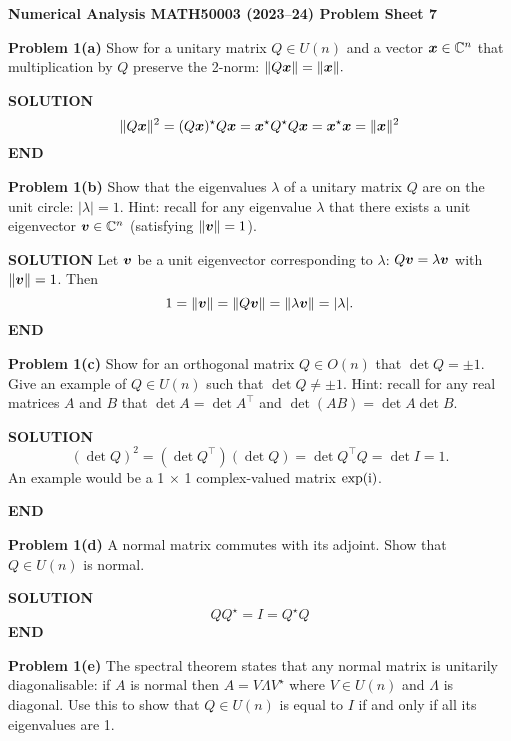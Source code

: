 \documentclass[12pt,a4paper]{article}
\def\endash{–}
\def\bbC{ {\mathbb C} }
\def\x{ {\vc x} }
\def\v{ {\vc v} }
\begin{document}
\textbf{Numerical Analysis MATH50003 (2023\ensuremath{\endash}24) Problem Sheet 7}

\textbf{Problem 1(a)} Show for a unitary matrix $Q \ensuremath{\in} U(n)$ and a vector $\ensuremath{\bm{\x}} \ensuremath{\in} \ensuremath{\bbC}^n$ that multiplication by $Q$ preserve the 2-norm: $\|Q \ensuremath{\bm{\x}}\| = \|\ensuremath{\bm{\x}}\|.$

\textbf{SOLUTION}
\[
\|Q \ensuremath{\bm{\x}}\|^2 = (Q \ensuremath{\bm{\x}})^\ensuremath{\star} Q \ensuremath{\bm{\x}} = \ensuremath{\bm{\x}}^\ensuremath{\star} Q^\ensuremath{\star} Q \ensuremath{\bm{\x}} = \ensuremath{\bm{\x}}^\ensuremath{\star}  \ensuremath{\bm{\x}} = \|\ensuremath{\bm{\x}}\|^2
\]
\textbf{END}

\textbf{Problem 1(b)} Show that the eigenvalues $\ensuremath{\lambda}$ of a unitary matrix $Q$ are on the unit circle: $|\ensuremath{\lambda}| = 1$. Hint: recall for any eigenvalue $\ensuremath{\lambda}$ that there exists a unit eigenvector $\ensuremath{\bm{\v}} \ensuremath{\in} \ensuremath{\bbC}^n$ (satisfying $\| \ensuremath{\bm{\v}} \| = 1$). 

\textbf{SOLUTION} Let $\ensuremath{\bm{\v}}$ be a unit eigenvector corresponding to $\ensuremath{\lambda}$: $Q \ensuremath{\bm{\v}} = \ensuremath{\lambda} \ensuremath{\bm{\v}}$ with $\|\ensuremath{\bm{\v}}\| = 1$. Then
\[
1 = \| \ensuremath{\bm{\v}} \| = \|Q \ensuremath{\bm{\v}} \| =  \| \ensuremath{\lambda} \ensuremath{\bm{\v}} \| = |\ensuremath{\lambda}|.
\]
\textbf{END}

\textbf{Problem 1(c)} Show for an orthogonal matrix $Q \ensuremath{\in} O(n)$ that $\det Q = \ensuremath{\pm}1$. Give an example of $Q \ensuremath{\in} U(n)$ such that $\det Q \ensuremath{\neq} \ensuremath{\pm}1$. Hint: recall for any real matrices $A$ and $B$ that $\det A = \det A^\ensuremath{\top}$ and $\det(AB) = \det A \det B$.

\textbf{SOLUTION}
\[
(\det Q)^2 = (\det Q^\ensuremath{\top})(\det Q) = \det Q^\ensuremath{\top}Q = \det I = 1.
\]
An example would be a 1 \ensuremath{\times} 1 complex-valued matrix $\exp({\rm i})$.

\textbf{END}

\textbf{Problem 1(d)} A normal matrix commutes with its adjoint. Show that $Q \ensuremath{\in} U(n)$ is normal.

\textbf{SOLUTION}
\[
 QQ^\ensuremath{\star} = I = Q^\ensuremath{\star}Q
\]
\textbf{END}

\textbf{Problem 1(e)}  The spectral theorem states that any normal matrix is unitarily diagonalisable: if $A$ is normal then $A = V \ensuremath{\Lambda} V^\ensuremath{\star}$ where $V \ensuremath{\in} U(n)$ and $\ensuremath{\Lambda}$ is diagonal. Use this to show that  $Q \ensuremath{\in} U(n)$ is equal to $I$ if and only if all its eigenvalues are 1.
\end{document}
